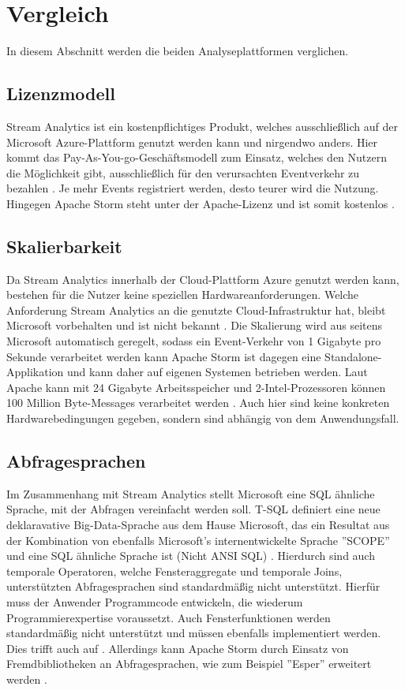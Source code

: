 \section{Vergleich}

In diesem Abschnitt werden die beiden Analyseplattformen verglichen. 


\subsection{Lizenzmodell}
Stream Analytics ist ein kostenpflichtiges Produkt, welches ausschließlich auf der Microsoft Azure-Plattform genutzt werden kann und nirgendwo anders. Hier kommt das Pay-As-You-go-Geschäftsmodell zum Einsatz, welches den Nutzern die Möglichkeit gibt, ausschließlich für den verursachten Eventverkehr zu bezahlen \cite{Pricing.2017}. Je mehr Events registriert werden, desto teurer wird die Nutzung. Hingegen Apache Storm steht unter der Apache-Lizenz und ist somit kostenlos \cite{lizenz.2004}. 

\subsection{Skalierbarkeit}
Da Stream Analytics innerhalb der Cloud-Plattform Azure genutzt werden kann, bestehen für die Nutzer keine speziellen Hardwareanforderungen. Welche Anforderung Stream Analytics an die genutzte Cloud-Infrastruktur hat, bleibt Microsoft vorbehalten und ist nicht bekannt \cite{samacha.2017}. Die Skalierung wird aus seitens Microsoft automatisch geregelt, sodass ein Event-Verkehr von 1 Gigabyte pro Sekunde verarbeitet werden kann \cite{samacha.19.12.2017b} Apache Storm ist dagegen eine Standalone-Applikation und kann daher auf eigenen Systemen betrieben werden. Laut Apache kann mit 24 Gigabyte Arbeitsspeicher und 2-Intel-Prozessoren können 100 Million Byte-Messages verarbeitet werden \cite{apachescale.2017}. Auch hier sind keine konkreten Hardwarebedingungen gegeben, sondern sind abhängig von dem Anwendungsfall.

\subsection{Abfragesprachen}
Im Zusammenhang mit Stream Analytics stellt Microsoft eine SQL ähnliche Sprache, mit der Abfragen vereinfacht werden soll. T-SQL definiert eine neue deklaravative Big-Data-Sprache aus dem Hause Microsoft, das ein Resultat aus der Kombination von ebenfalls Microsoft’s internentwickelte Sprache ''SCOPE'' und eine SQL ähnliche Sprache ist (Nicht ANSI SQL) \cite{sql.2016}. Hierdurch sind auch temporale Operatoren, welche Fensteraggregate und temporale Joins, unterstützten  Abfragesprachen sind standardmäßig nicht unterstützt. Hierfür muss der Anwender Programmcode entwickeln, die wiederum Programmierexpertise voraussetzt. Auch Fensterfunktionen werden standardmäßig nicht unterstützt und müssen ebenfalls implementiert werden. Dies trifft auch auf  \cite{samacha.2017}. Allerdings kann Apache Storm durch Einsatz von Fremdbibliotheken an Abfragesprachen, wie zum Beispiel ''Esper'' erweitert werden \cite{esper.2016}.


